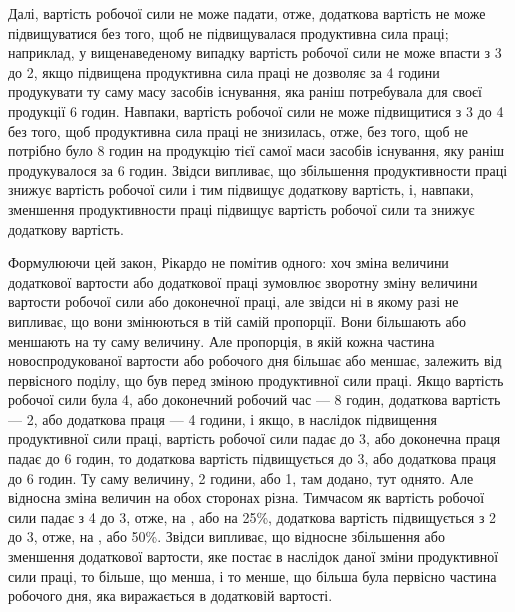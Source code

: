
Далі, вартість робочої сили не може падати, отже, додаткова
вартість не може підвищуватися без того, щоб не підвищувалася
продуктивна сила праці; наприклад, у вищенаведеному випадку
вартість робочої сили не може впасти з 3 до 2, якщо
підвищена продуктивна сила праці не дозволяє за 4 години продукувати
ту саму масу засобів існування, яка раніш потребувала
для своєї продукції 6 годин. Навпаки, вартість робочої сили не
може підвищитися з 3 до 4 без того, щоб продуктивна
сила праці не знизилась, отже, без того, щоб не потрібно було
8 годин на продукцію тієї самої маси засобів існування, яку раніш
продукувалося за 6 годин. Звідси випливає, що збільшення продуктивности
праці знижує вартість робочої сили і тим підвищує
додаткову вартість, і, навпаки, зменшення продуктивности праці
підвищує вартість робочої сили та знижує додаткову вартість.

Формулюючи цей закон, Рікардо не помітив одного: хоч зміна
величини додаткової вартости або додаткової праці зумовлює
зворотну зміну величини вартости робочої сили або доконечної
праці, але звідси ні в якому разі не випливає, що вони змінюються
в тій самій пропорції. Вони більшають або меншають на ту саму
величину. Але пропорція, в якій кожна частина новоспродукованої
вартости або робочого дня більшає або меншає, залежить
від первісного поділу, що був перед зміною продуктивної сили
праці. Якщо вартість робочої сили була 4, або доконечний
робочий час — 8 годин, додаткова вартість — 2,
або додаткова праця — 4 години, і якщо, в наслідок підвищення
продуктивної сили праці, вартість робочої сили падає
до 3, або доконечна праця падає до 6 годин, то додаткова
вартість підвищується до 3, або додаткова праця
до 6 годин. Ту саму величину, 2 години, або 1, там додано,
тут однято. Але відносна зміна величин на обох сторонах
різна. Тимчасом як вартість робочої сили падає з 4
до 3, отже, на , або на 25\%, додаткова вартість підвищується
з 2 до 3, отже, на , або 50\%. Звідси випливає, що
відносне збільшення або зменшення додаткової вартости, яке
постає в наслідок даної зміни продуктивної сили праці, то більше,
що менша, і то менше, що більша була первісно частина робочого
дня, яка виражається в додатковій вартості.

